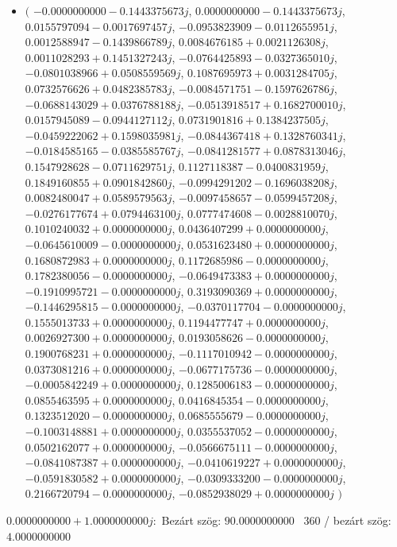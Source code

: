 \documentclass[14pt,a4paper]{article}
\begin{document}
\begin{itemize}
\item
$\big($
$-0.0000000000-0.1443375673j$, $0.0000000000-0.1443375673j$, $0.0155797094-0.0017697457j$, $-0.0953823909-0.0112655951j$, $0.0012588947-0.1439866789j$, $0.0084676185+0.0021126308j$, $0.0011028293+0.1451327243j$, $-0.0764425893-0.0327365010j$, $-0.0801038966+0.0508559569j$, $0.1087695973+0.0031284705j$, $0.0732576626+0.0482385783j$, $-0.0084571751-0.1597626786j$, $-0.0688143029+0.0376788188j$, $-0.0513918517+0.1682700010j$, $0.0157945089-0.0944127112j$, $0.0731901816+0.1384237505j$, $-0.0459222062+0.1598035981j$, $-0.0844367418+0.1328760341j$, $-0.0184585165-0.0385585767j$, $-0.0841281577+0.0878313046j$, $0.1547928628-0.0711629751j$, $0.1127118387-0.0400831959j$, $0.1849160855+0.0901842860j$, $-0.0994291202-0.1696038208j$, $0.0082480047+0.0589579563j$, $-0.0097458657-0.0599457208j$, $-0.0276177674+0.0794463100j$, $0.0777474608-0.0028810070j$, $0.1010240032+0.0000000000j$, $0.0436407299+0.0000000000j$, $-0.0645610009-0.0000000000j$, $0.0531623480+0.0000000000j$, $0.1680872983+0.0000000000j$, $0.1172685986-0.0000000000j$, $0.1782380056-0.0000000000j$, $-0.0649473383+0.0000000000j$, $-0.1910995721-0.0000000000j$, $0.3193090369+0.0000000000j$, $-0.1446295815-0.0000000000j$, $-0.0370117704-0.0000000000j$, $0.1555013733+0.0000000000j$, $0.1194477747+0.0000000000j$, $0.0026927300+0.0000000000j$, $0.0193058626-0.0000000000j$, $0.1900768231+0.0000000000j$, $-0.1117010942-0.0000000000j$, $0.0373081216+0.0000000000j$, $-0.0677175736-0.0000000000j$, $-0.0005842249+0.0000000000j$, $0.1285006183-0.0000000000j$, $0.0855463595+0.0000000000j$, $0.0416845354-0.0000000000j$, $0.1323512020-0.0000000000j$, $0.0685555679-0.0000000000j$, $-0.1003148881+0.0000000000j$, $0.0355537052-0.0000000000j$, $0.0502162077+0.0000000000j$, $-0.0566675111-0.0000000000j$, $-0.0841087387+0.0000000000j$, $-0.0410619227+0.0000000000j$, $-0.0591830582+0.0000000000j$, $-0.0309333200-0.0000000000j$, $0.2166720794-0.0000000000j$, $-0.0852938029+0.0000000000j$
$\big)$
\end{itemize}
$0.0000000000+1.0000000000j$:\
Bezárt szög: $90.0000000000$ \
360 / bezárt szög: $4.0000000000$\
\end{document}

